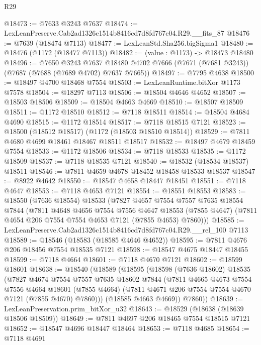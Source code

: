 \begin{lexlean}{R29}
\begin{coremodule}
@18473 := @7633 @3243 @7637
@18474 := LexLeanPreserve.Cab2ad1326c1514b8416cd7d8fd767c04.R29.__fits_87
@18476 := @7639 (@18474 @7113)
@18477 := LexLeanStd.Sha256.bigSigma1
@18480 := @18476 (@1172 (@18477 @7113))
@18482 := (value : @1173) -> @18473 @18480
@18496 := @7650
    @3243
    @7637
    @18480
    @4702
    @7666
    (@7671 (@7681 @3243))
    (@7687 (@7688 (@7689 @4702) @7637 @7665))
@18497 := @7795 @4638
@18500 := @18497 @4700 @18468 @7554
@18503 := LexLeanRuntime.bitXor @1173 @7578
@18504 := @18297 @7113
@18506 := @18504 @4646 @4652
@18507 := @18503 @18506
@18509 := @18504 @4663 @4669
@18510 := @18507 @18509
@18511 := @1172 @18510
@18512 := @7118 @18511
@18514 := @18504 @4684 @4690
@18515 := @1172 @18514
@18517 := @7118 @18515 @7121
@18523 := @18500 (@18512 @18517) (@1172 (@18503 @18510 @18514))
@18529 := @7811 @4680 @4699 @18461 @18467 @18511 @18517
@18532 := @18497 @4679 @18459 @7554
@18533 := @1172 @18506
@18534 := @7118 @18533
@18535 := @1172 @18509
@18537 := @7118 @18535 @7121
@18540 := @18532 (@18534 @18537) @18511
@18546 := @7811 @4659 @4678 @18452 @18458 @18533 @18537
@18547 := @8922 @4642
@18550 := @18547 @4658 @18447 @18451
@18551 := @7118 @4647
@18553 := @7118 @4653 @7121
@18554 := @18551 @18553
@18583 := @18550
    (@7636 @18554)
    @18533
    (@7827
      @4657
      @7554
      @7557
      @7635
      @18554
      @7844
      (@7811
        @4648
        @4656
        @7554
        @7556
        @4647
        @18553
        (@7855 @4647)
        (@7811 @4654 @206 @7554 @7554 @4653 @7121 (@7855 @4653) @7860)))
@18585 := LexLeanPreserve.Cab2ad1326c1514b8416cd7d8fd767c04.R29.__rel_100 @7113
@18589 := @18546 (@18583 (@18585 @4646 @4652))
@18595 := @7811 @4676 @206 @18456 @7554 @18535 @7121
@18598 := @18547 @4675 @18447 @18455
@18599 := @7118 @4664
@18601 := @7118 @4670 @7121
@18602 := @18599 @18601
@18638 := @18540
    (@18589
      (@18595
        (@18598
          (@7636 @18602)
          @18535
          (@7827
            @4674
            @7554
            @7557
            @7635
            @18602
            @7844
            (@7811
              @4665
              @4673
              @7554
              @7556
              @4664
              @18601
              (@7855 @4664)
              (@7811 @4671 @206 @7554 @7554 @4670 @7121 (@7855 @4670) @7860)))
          (@18585 @4663 @4669))
        @7860))
@18639 := LexLeanPreservation.prim_bitXor_u32
@18643 := @18529 (@18638 (@18639 @18506 @18509))
@18649 := @7811 @4697 @206 @18465 @7554 @18515 @7121
@18652 := @18547 @4696 @18447 @18464
@18653 := @7118 @4685
@18654 := @7118 @4691

\end{coremodule}
\end{lexlean}
